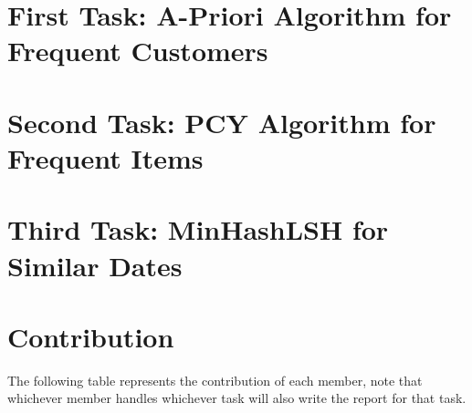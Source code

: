 \documentclass[conference]{IEEEtran}
\begin{document}
    \section{First Task: A-Priori Algorithm for Frequent Customers}
    \label{sec:first-task}
    

    \section{Second Task: PCY Algorithm for Frequent Items}
    \label{sec:second-task}
    

    \section{Third Task: MinHashLSH for Similar Dates}
    \label{sec:third-task}
    

    \section{Contribution}
    \label{sec:contribution}

    The following table represents the contribution of each member, note that whichever member handles whichever task will also write the report for that task.

    \begin{table}[h]
        \centering
        \caption{Members Contributions}
        \setlength{\tabcolsep}{2pt} %
        \renewcommand{\arraystretch}{1} %
        \label{tab:contributions}
    \end{table}
\end{document}
